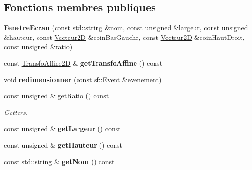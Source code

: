 \subsection*{Fonctions membres publiques}
\begin{DoxyCompactItemize}
\item 
\mbox{\label{class_fenetre_ecran_a47ffd892fcd19b88ee4155c9f8e7bdb6}} 
{\bfseries Fenetre\+Ecran} (const std\+::string \&nom, const unsigned \&largeur, const unsigned \&hauteur, const \mbox{\hyperlink{class_vecteur2_d}{Vecteur2D}} \&coin\+Bas\+Gauche, const \mbox{\hyperlink{class_vecteur2_d}{Vecteur2D}} \&coin\+Haut\+Droit, const unsigned \&ratio)
\item 
\mbox{\label{class_fenetre_ecran_a29ecd8e6c4f773b85b5e344b0ebb67da}} 
const \mbox{\hyperlink{class_transfo_affine2_d}{Transfo\+Affine2D}} \& {\bfseries get\+Transfo\+Affine} () const
\item 
\mbox{\label{class_fenetre_ecran_a140ef3ad64d75a9db5ba33eb7584bc6a}} 
void {\bfseries redimensionner} (const sf\+::\+Event \&evenement)
\item 
\mbox{\label{class_fenetre_ecran_a3a4e5cf7431f2a16530d297a9a3a5ea6}} 
const unsigned \& \mbox{\hyperlink{class_fenetre_ecran_a3a4e5cf7431f2a16530d297a9a3a5ea6}{get\+Ratio}} () const
\begin{DoxyCompactList}\small\item\em Getters. \end{DoxyCompactList}\item 
\mbox{\label{class_fenetre_ecran_aa9424ea54ea0e9296522c53aeba8eb54}} 
const unsigned \& {\bfseries get\+Largeur} () const
\item 
\mbox{\label{class_fenetre_ecran_a39f1bb797e7e8959becdf749e6375eb3}} 
const unsigned \& {\bfseries get\+Hauteur} () const
\item 
\mbox{\label{class_fenetre_ecran_a8f46cab96060e09b4f9ddce25139e362}} 
const std\+::string \& {\bfseries get\+Nom} () const
\item 
\mbox{\label{class_fenetre_ecran_af914092b4e31c40078139552073af215}} 

\end{DoxyCompactItemize}
